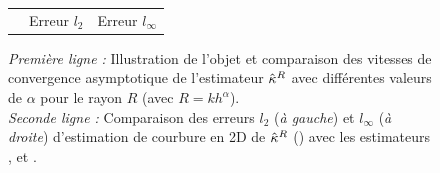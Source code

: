\begin{figure}[ht]
\begin{center}
\begin{tabular}{@{}l c c @{}}
      \\
      &
      Erreur $l_2$ &
      Erreur $l_\infty$
    \end{tabular}
    \caption[Évaluation expérimentale sur l'objet \AccFlower.]{
      \emph{Première ligne :} Illustration de l'objet \AccFlower et comparaison
      des vitesses de convergence asymptotique de l'estimateur $\hat{\kappa}^{R}$ avec
      différentes valeurs de $\alpha$ pour le rayon $R$ (avec $R=kh^\alpha$).
      \\
      \emph{Seconde ligne :} Comparaison des erreurs $l_2$ (\emph{à gauche}) et
      $l_\infty$ (\emph{à droite}) d'estimation de courbure en 2D de $\hat{\kappa}^{R}$
      (\II) avec les estimateurs \BC \cite{Esbelin2011}, \MDSS
      \cite{Coeurjolly2001,deVieilleville2007} et \MDCA \cite{Roussillon2011}.
      }
      \label{fig:curv-experiments-accflower}
  \end{center}
\end{figure}

